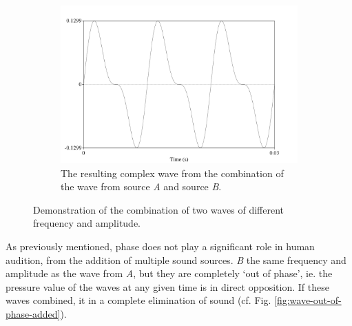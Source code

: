 \begin{figure}[H]
\begin{center}
\begin{subfigure}{0.5\textwidth}
  \includegraphics[width=\textwidth]{figure/sound-wave-addition-combined.png}
  \caption{The resulting complex wave from the combination of the wave from source \textit{A} and source \textit{B}.}
  \label{fig:sound-wave-addition-combined}
\end{subfigure}
\end{center}
\caption{Demonstration of the combination of two waves of different frequency and amplitude.}
\label{fig:sound-wave-addition}
\end{figure}

As previously mentioned, phase does not play a significant role in human audition, \DIFdelbegin {}\DIFdelend \DIFaddbegin {}\DIFaddend from the addition of multiple sound sources.  \DIFdelbegin {}\DIFdelend \DIFaddbegin {}\DIFaddend \textit{B} \DIFdelbegin {}\DIFdelend \DIFaddbegin {}\DIFaddend the same frequency and amplitude as the wave from \DIFdelbegin {}\DIFdelend \DIFaddbegin {}\DIFaddend \textit{A}, but they are completely `out of phase', ie. the pressure value of the waves at any given time is in direct opposition\DIFdelbegin {}\DIFdelend .  If these waves \DIFdelbegin {}\DIFdelend \DIFaddbegin {}\DIFaddend combined, it \DIFdelbegin {}\DIFdelend \DIFaddbegin {}\DIFaddend in a complete elimination of sound (cf. Fig. \ref{fig:wave-out-of-phase-added}).

